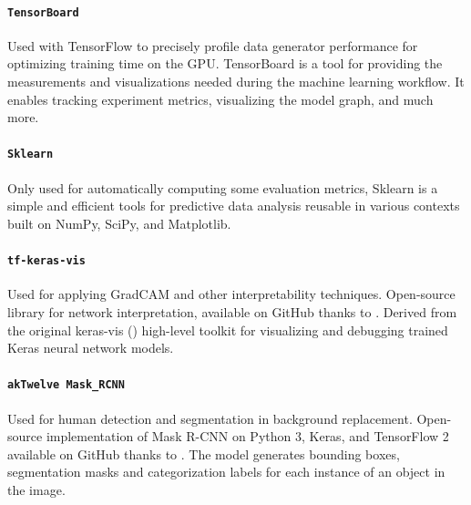 \paragraph*{\texttt{TensorBoard}}
Used with TensorFlow to precisely profile data generator performance for optimizing training time on the GPU. TensorBoard is a tool for providing the measurements and visualizations needed during the machine learning workflow. It enables tracking experiment metrics, visualizing the model graph, and much more.

\paragraph*{\texttt{Sklearn}}
Only used for automatically computing some evaluation metrics, Sklearn is a simple and efficient tools for predictive data analysis reusable in various contexts built on NumPy, SciPy, and Matplotlib.

\paragraph*{\texttt{tf-keras-vis}}
Used for applying GradCAM and other interpretability techniques. Open-source library for network interpretation, available on GitHub thanks to \cite{tf-keras-vis}. Derived from the original keras-vis (\cite{keras-vis}) high-level toolkit for visualizing and debugging trained Keras neural network models.

\paragraph*{\texttt{akTwelve Mask\_RCNN}}
Used for human detection and segmentation in background replacement. Open-source implementation of Mask R-CNN on Python 3, Keras, and TensorFlow 2 available on GitHub thanks to \cite{MaskRCNN_akTwelve}. The model generates bounding boxes, segmentation masks and categorization labels for each instance of an object in the image.







